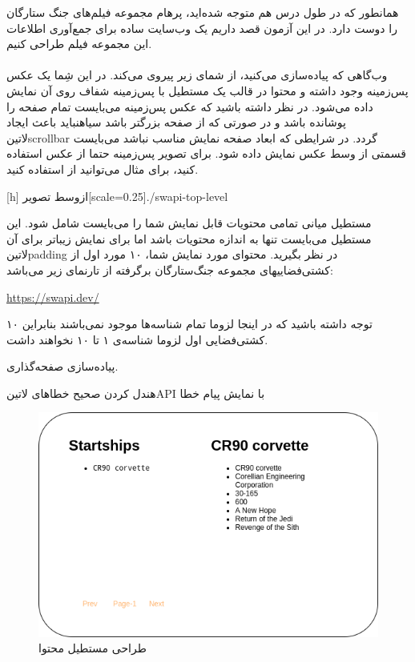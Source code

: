 \documentclass[../main.tex]{subfiles}
\begin{document}

همانطور که در طول درس هم متوجه شده‌اید، پرهام مجموعه فیلم‌های جنگ ستارگان را دوست دارد.
در این آزمون قصد داریم یک وب‌سایت ساده برای جمع‌آوری اطلاعات این مجموعه فیلم طراحی کنیم.

\paragraph{}
وب‌گاهی که پیاده‌سازی می‌کنید، از شمای زیر پیروی می‌کند. در این شِما یک عکس پس‌زمینه وجود داشته و محتوا در قالب یک مستطیل با پس‌زمینه شفاف روی آن نمایش داده می‌شود.
در نظر داشته باشید که عکس پس‌زمینه می‌بایست تمام صفحه را پوشانده باشد و در صورتی که از صفحه بزرگتر باشد ‌سیاه{نباید} باعث ایجاد ‌لاتین{scrollbar} گردد.
در شرایطی که ابعاد صفحه نمایش مناسب نباشد می‌بایست قسمتی از وسط عکس نمایش داده شود.
برای تصویر پس‌زمینه حتما از عکس استفاده کنید، برای مثال می‌توانید از  استفاده کنید.

[h]
  ‌ازوسط
  ‌تصویر[scale=0.25]{./swapi-top-level}

مستطیل میانی تمامی محتویات قابل نمایش شما را می‌بایست شامل شود. این مستطیل می‌بایست تنها به اندازه محتویات باشد اما برای نمایش زیباتر برای آن ‌لاتین{padding} در نظر بگیرید.
محتوای مورد نمایش شما، ۱۰ مورد اول از کشتی‌فضاییهای مجموعه جنگ‌ستارگان برگرفته از تارنمای زیر می‌باشد:

\begin{latin}
  \url{https://swapi.dev/}
\end{latin}

توجه داشته باشید که در اینجا لزوما تمام شناسه‌ها موجود نمی‌باشند بنابراین ۱۰ کشتی‌فضایی اول لزوما شناسه‌ی ۱ تا ۱۰ نخواهند داشت.

پیاده‌سازی صفحه‌گذاری.

هندل کردن صحیح خطاهای ‌لاتین{API} با نمایش پیام خطا

\begin{figure}[h]
  \centering
  \includegraphics[scale=0.25]{./swapi-content}
  \caption{طراحی مستطیل محتوا}
\end{figure}
\end{document}
